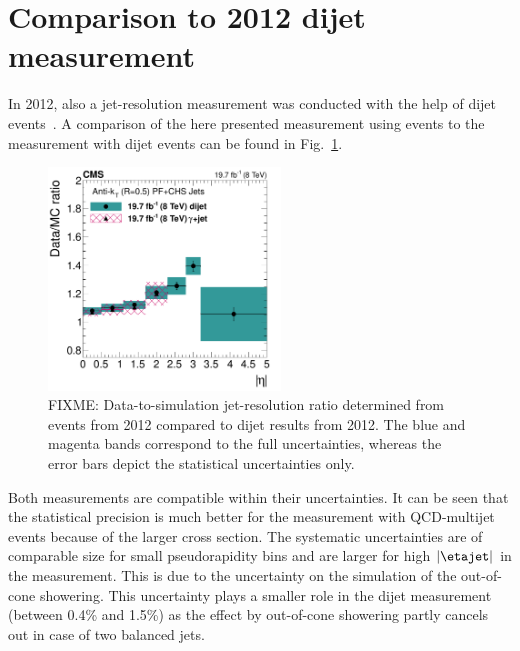 \section{Comparison to 2012 dijet measurement}
\label{res:sec:comparison_2012}
In 2012, also a jet-\pt resolution measurement was conducted with the help of dijet events~\cite{bib:CMS:JME_PAS,bib:Kristin_Thesis}.
A comparison of the here presented measurement using \GAMJET events to the measurement with dijet events can be found in Fig.~\ref{res:fig:Comparison_2012}.
\begin{figure}[b]
 \centering
    \includegraphics[width=0.55\textwidth]{figures/resolution/results/JER_2012_compPhoton_final_v2.pdf}
  \caption{FIXME: Data-to-simulation jet-\pt resolution ratio determined from \GAMJET events from 2012 compared to dijet results from 2012.
           The blue and magenta bands correspond to the full uncertainties, whereas the error bars depict the statistical uncertainties only.}
  \label{res:fig:Comparison_2012}
\end{figure}
Both measurements are compatible within their uncertainties.
It can be seen that the statistical precision is much better for the measurement with QCD-multijet events because of the larger cross section.
The systematic uncertainties are of comparable size for small pseudorapidity bins and are larger for high $|\etajet|$ in the \GAMJET measurement.
This is due to the uncertainty on the simulation of the out-of-cone showering.
This uncertainty plays a smaller role in the dijet measurement (between 0.4\% and 1.5\%) as the effect by out-of-cone showering partly cancels out in case of two balanced jets.

